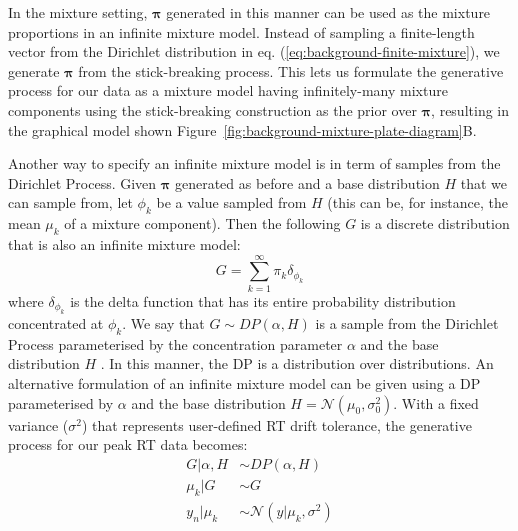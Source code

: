 In the mixture setting, $\boldsymbol{\pi}$ generated in this manner can be used as the mixture proportions in an infinite mixture model. Instead of sampling a finite-length vector from the Dirichlet distribution in eq. (\ref{eq:background-finite-mixture}), we generate $\boldsymbol{\pi}$ from the stick-breaking process. This lets us formulate the generative process for our data as a mixture model having infinitely-many mixture components using the stick-breaking construction as the prior over $\boldsymbol{\pi}$, resulting in the graphical model shown Figure~\ref{fig:background-mixture-plate-diagram}B.

Another way to specify an infinite mixture model is in term of samples from the Dirichlet Process. Given $\boldsymbol{\pi}$ generated as before and a base distribution $H$ that we can sample from, let $\phi_k$ be a value sampled from $H$ (this can be, for instance, the mean $\mu_k$ of a mixture component). Then the following $G$ is a discrete distribution that is also an infinite mixture model:
\begin{equation}
G=\sum_{k=1}^{\infty} \pi_k \delta_{\phi_k}
\end{equation}
where $\delta_{\phi_k}$ is the delta function that has its entire probability distribution concentrated at $\phi_k$. We say that $G \sim DP(\alpha, H)$ is a sample from the Dirichlet Process parameterised by the concentration parameter $\alpha$ and the base distribution $H$ \cite{teh2011dirichlet}. In this manner, the DP is a distribution over distributions. An alternative formulation of an infinite mixture model can be given using a DP parameterised by $\alpha$ and the base distribution $H=\mathcal{N}(\mu_0, \sigma_0^2)$. With a fixed variance ($\sigma^2$) that represents user-defined RT drift tolerance, the generative process for our peak RT data becomes:
\begin{equation}
\begin{aligned}
G \vert \alpha, H  &\sim DP(\alpha, H) \\
\mu_k \vert G     &\sim G \\
y_n \vert \mu_k  &\sim \mathcal{N}(y \vert \mu_k, \sigma^2)
\end{aligned}
\label{eq:background-infinite-mixture-dp}
\end{equation}

